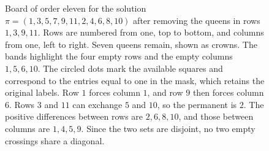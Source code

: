 \begin{figure}[htbp]
\centering
{}
\caption{Board of order eleven for the solution $\pi=(1,3,5,7,9,11,2,4,6,8,10)$ after removing
the queens in rows $1,3,9,11$. Rows are numbered from one, top to bottom, and columns from one, left
to right. Seven queens remain, shown as crowns. The bands highlight the four empty rows and the
empty columns $1,5,6,10$. The circled dots mark the available squares and correspond to the entries
equal to one in the mask, which retains the original labels. Row $1$ forces column $1$, and row $9$
then forces column $6$. Rows $3$ and $11$ can exchange $5$ and $10$, so the permanent is $2$. The positive
differences between rows are $2,6,8,10$, and those between columns are $1,4,5,9$. Since the two
sets are disjoint, no two empty crossings share a diagonal.}\label{fig:terminal}
\end{figure}
